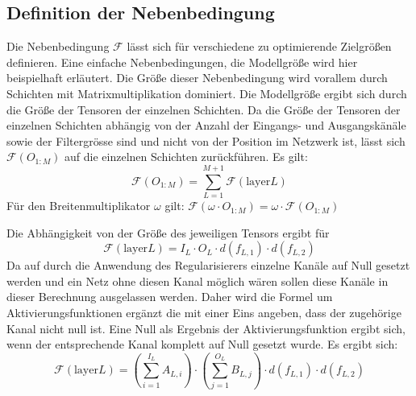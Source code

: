 \subsection{Definition der Nebenbedingung}
Die Nebenbedingung $\mathcal{F}$ lässt sich für verschiedene zu optimierende Zielgrößen definieren. Eine einfache Nebenbedingungen, die Modellgröße wird hier beispielhaft erläutert. Die Größe dieser Nebenbedingung wird vorallem durch Schichten mit Matrixmultiplikation dominiert. Die Modellgröße ergibt sich durch die Größe der Tensoren der einzelnen Schichten. Da die Größe der Tensoren der einzelnen Schichten abhängig von der Anzahl der Eingangs- und Ausgangskänäle sowie der Filtergrösse sind und nicht von der Position im Netzwerk ist, lässt sich $\mathcal{F}(O_{1:M})$ auf die einzelnen Schichten zurückführen. Es gilt:
\begin{equation}
 \mathcal{F}(O_{1:M})=\sum_{L=1}^{M+1} \mathcal{F}(\text{layer} L)
\end{equation}
Für den Breitenmultiplikator $\omega$ gilt: $\mathcal{F}(\omega \cdot O_{1:M})=\omega \cdot \mathcal{F}(O_{1:M})$

Die Abhängigkeit von der Größe des jeweiligen Tensors ergibt für 
\begin{equation}
\mathcal{F}(\text{layer} L)=I_L \cdot O_L \cdot d(f_{L,1}) \cdot d(f_{L,2})  
\end{equation}
Da auf durch die Anwendung des Regularisierers einzelne Kanäle auf Null gesetzt werden und ein Netz ohne diesen Kanal möglich wären sollen diese Kanäle in dieser Berechnung ausgelassen werden. Daher wird die Formel um Aktivierungsfunktionen ergänzt die mit einer Eins angeben, dass der zugehörige Kanal nicht null ist. Eine Null als Ergebnis der Aktivierungsfunktion ergibt sich, wenn der entsprechende Kanal komplett auf Null gesetzt wurde. Es ergibt sich:
\begin{equation}
\mathcal{F}(\text{layer} L)=\left(\sum_{i=1}^{I_L} A_{L,i} \right) \cdot \left(\sum_{j=1}^{O_L} B_{L,j}\right) \cdot d(f_{L,1}) \cdot d(f_{L,2})  
\end{equation}


